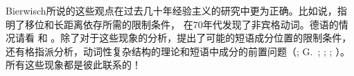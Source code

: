 Bierwisch所说的这些观点在过去几十年经验主义的研究中更为正确。比如说，\citet{Ross67}指明了移位和长距离依存所需的限制条件，\citet{Perlmutter78} 在70年代发现了非宾格动词。德语的情况请看 和 。除了对于这些现象的分析，\citep{Lenerz77}提出了可能的短语成分位置的限制条件，还有格指派分析\citep*{YMJ87,Meurers99b,Prze99}，动词性复杂结构的理论和短语中成分的前置问题（\citealp{Evers75a,Grewendorf88a,HN94a,Kiss95a}; G.\ \citealp{GMueller98a};
\citealp{Meurers99c}; \citealp{Mueller99a,Mueller2002b}; \citealp{deKuthy2002a}）。所有这些现象都是彼此联系的！

